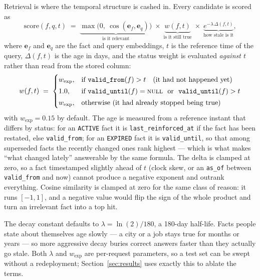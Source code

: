 \documentclass[11pt,a4paper]{article}
\begin{document}
Retrieval is where the temporal structure is cashed in. Every candidate is
scored as
\begin{equation}
\label{eq:score}
\mathrm{score}(f, q, t) \;=\; \underbrace{\max\!\big(0,\ \cos(\mathbf{e}_f, \mathbf{e}_q)\big)}_{\text{is it relevant}}
\;\times\; \underbrace{w(f, t)}_{\text{is it still true}}
\;\times\; \underbrace{e^{-\lambda\,\Delta(f,t)}}_{\text{how stale is it}},
\end{equation}
where $\mathbf{e}_f$ and $\mathbf{e}_q$ are the fact and query embeddings,
$t$ is the reference time of the query, $\Delta(f,t)$ is the age in days, and
the status weight is evaluated \emph{against $t$} rather than read from the
stored column:
\begin{equation}
\label{eq:weight}
w(f,t) \;=\;
\begin{cases}
w_{\text{exp}}, & \text{if } \texttt{valid\_from}(f) > t \quad \text{(it had not happened yet)}\\[2pt]
1.0, & \text{if } \texttt{valid\_until}(f) = \textsc{null} \ \text{ or } \ \texttt{valid\_until}(f) > t\\[2pt]
w_{\text{exp}}, & \text{otherwise (it had already stopped being true)}
\end{cases}
\end{equation}
with $w_{\text{exp}} = 0.15$ by default. The age is measured from a reference
instant that differs by status: for an \texttt{ACTIVE} fact it is
\texttt{last\_reinforced\_at} if the fact has been restated, else
\texttt{valid\_from}; for an \texttt{EXPIRED} fact it is \texttt{valid\_until},
so that among superseded facts the recently changed ones rank highest --- which
is what makes ``what changed lately'' answerable by the same formula. The delta
is clamped at zero, so a fact timestamped slightly ahead of $t$ (clock skew, or
an \texttt{as\_of} between \texttt{valid\_from} and now) cannot produce a
negative exponent and outrank everything. Cosine similarity is clamped at zero
for the same class of reason: it runs $[-1,1]$, and a negative value would flip
the sign of the whole product and turn an irrelevant fact into a top hit.

The decay constant defaults to $\lambda = \ln(2)/180$, a 180-day half-life.
Facts people state about themselves age slowly --- a city or a job stays true
for months or years --- so more aggressive decay buries correct answers faster
than they actually go stale. Both $\lambda$ and $w_{\text{exp}}$ are
per-request parameters, so a test set can be swept without a redeployment;
Section~\ref{sec:results} uses exactly this to ablate the terms.
\end{document}
